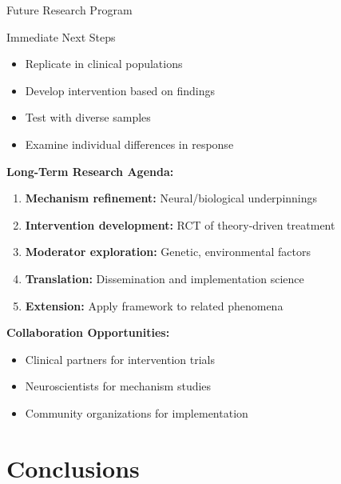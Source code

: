 \documentclass[aspectratio=169,12pt]{beamer}
\begin{document}
\begin{frame}{Future Research Program}
  \begin{block}{Immediate Next Steps}
    \begin{itemize}
      \item Replicate in clinical populations
      \item Develop intervention based on findings
      \item Test with diverse samples
      \item Examine individual differences in response
    \end{itemize}
  \end{block}

  \vspace{0.5cm}

  \textbf{Long-Term Research Agenda:}
  \begin{enumerate}
    \item \textbf{Mechanism refinement:} Neural/biological underpinnings
    \item \textbf{Intervention development:} RCT of theory-driven treatment
    \item \textbf{Moderator exploration:} Genetic, environmental factors
    \item \textbf{Translation:} Dissemination and implementation science
    \item \textbf{Extension:} Apply framework to related phenomena
  \end{enumerate}

  \vspace{0.5cm}

  \textbf{Collaboration Opportunities:}
  \begin{itemize}
    \item Clinical partners for intervention trials
    \item Neuroscientists for mechanism studies
    \item Community organizations for implementation
  \end{itemize}
\end{frame}


\section{Conclusions}
\end{document}
